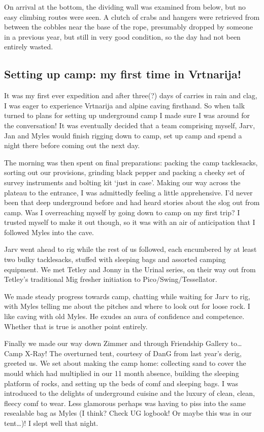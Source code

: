On arrival at the bottom, the dividing wall was examined from below, but
no easy climbing routes were seen. A clutch of crabs and hangers were
retrieved from between the cobbles near the base of the rope, presumably
dropped by someone in a previous year, but still in very good condition,
so the day had not been entirely wasted.


\hypertarget{setting-up-camp-my-first-time-in-vrtnarija}{%
\subsection{Setting up camp: my first time in
Vrtnarija!}\label{setting-up-camp-my-first-time-in-vrtnarija}}

It was my first ever expedition and after three(?) days of carries in
rain and clag, I was eager to experience Vrtnarija and alpine caving
firsthand. So when talk turned to plans for setting up underground camp
I made sure I was around for the conversation! It was eventually decided
that a team comprising myself, Jarv, Jan and Myles would finish rigging
down to camp, set up camp and spend a night there before coming out the
next day.

The morning was then spent on final preparations: packing the camp
tacklesacks, sorting out our provisions, grinding black pepper and
packing a cheeky set of survey instruments and bolting kit `just in
case'. Making our way across the plateau to the entrance, I was
admittedly feeling a little apprehensive. I'd never been that deep
underground before and had heard stories about the slog out from camp.
Was I overreaching myself by going down to camp on my first trip? I
trusted myself to make it out though, so it was with an air of
anticipation that I followed Myles into the cave.

Jarv went ahead to rig while the rest of us followed, each encumbered by
at least two bulky tacklesacks, stuffed with sleeping bags and assorted
camping equipment. We met Tetley and Jonny in the Urinal series, on
their way out from Tetley's traditional Mig fresher initiation to
Pico/Swing/Tessellator.

We made steady progress towards camp, chatting while waiting for Jarv to
rig, with Myles telling me about the pitches and where to look out for
loose rock. I like caving with old Myles. He exudes an aura of
confidence and competence. Whether that is true is another point
entirely.

Finally we made our way down Zimmer and through Friendship Gallery
to\ldots{} Camp X-Ray! The overturned tent, courtesy of DanG from last
year's derig, greeted us. We set about making the camp home: collecting
sand to cover the mould which had multiplied in our 11 month absence,
building the sleeping platform of rocks, and setting up the beds of comf
and sleeping bags. I was introduced to the delights of underground
cuisine and the luxury of clean, clean, fleecy comf to wear. Less
glamorous perhaps was having to piss into the same resealable bag as
Myles (I think? Check UG logbook! Or maybe this was in our
tent\ldots{})! I slept well that night.

